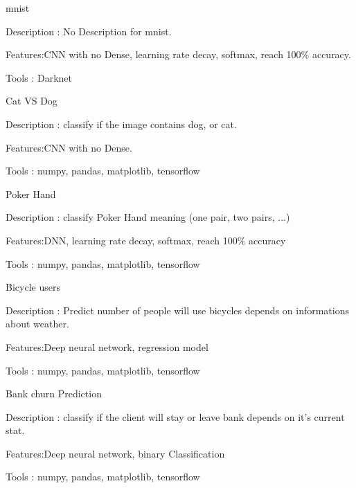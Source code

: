 \documentclass[a4paper,13pt,final]{memoir}
\newcommand{\SmallSep}{\vspace{0.5em}}
\begin{document}
\begin{compactitem}[\color{RoyalBlue}$\circ$]
		\item mnist
	\begin{compactitem}[\color{RoyalBlue}$\circ$]
		\item Description : No Description for mnist.
		\item Features:CNN with no Dense, learning rate decay, softmax, reach 100\% accuracy.
		\item Tools : Darknet
	\end{compactitem}
	\SmallSep
	
	\item Cat VS Dog
	\begin{compactitem}[\color{RoyalBlue}$\circ$]
		\item Description : classify if the image contains dog, or cat.
		\item Features:CNN with no Dense.
		\item Tools :  numpy, pandas, matplotlib, tensorflow
	\end{compactitem}
	\SmallSep

	\item Poker Hand
	\begin{compactitem}[\color{RoyalBlue}$\circ$]
		\item Description : classify Poker Hand meaning (one pair, two pairs, ...)
		\item Features:DNN, learning rate decay, softmax, reach 100\% accuracy
		\item Tools :  numpy, pandas, matplotlib, tensorflow
	\end{compactitem}
	\SmallSep

	\item Bicycle users
	\begin{compactitem}[\color{RoyalBlue}$\circ$]
		\item Description : Predict number of people will use bicycles depends on informations about weather.
		\item Features:Deep neural network, regression model
		\item Tools :  numpy, pandas, matplotlib, tensorflow
	\end{compactitem}
	\SmallSep
	
		\item Bank churn Prediction
	\begin{compactitem}[\color{RoyalBlue}$\circ$]
		\item Description : classify if the client will stay or leave bank depends on it's current stat.
		\item Features:Deep neural network, binary Classification
		\item Tools :  numpy, pandas, matplotlib, tensorflow
	\end{compactitem}
	\SmallSep
	

\end{compactitem}
\end{document}
